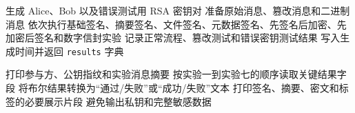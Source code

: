 \documentclass[12pt]{article}
\begin{document}
\begin{algorithm}[H]
\caption{\texttt{run\_all\_experiments()}}
\setcounter{AlgoLine}{0}
生成 Alice、Bob 以及错误测试用 RSA 密钥对\;
准备原始消息、篡改消息和二进制消息\;
依次执行基础签名、摘要签名、文件签名、元数据签名、先签名后加密、先加密后签名和数字信封实验\;
记录正常流程、篡改测试和错误密钥测试结果\;
写入生成时间并返回 \texttt{results} 字典\;
\end{algorithm}

\begin{algorithm}[H]
\caption{\texttt{print\_result\_summary(results)}}
\setcounter{AlgoLine}{0}
打印参与方、公钥指纹和实验消息摘要\;
按实验一到实验七的顺序读取关键结果字段\;
将布尔结果转换为“通过/失败”或“成功/失败”文本\;
打印签名、摘要、密文和标签的必要展示片段\;
避免输出私钥和完整敏感数据\;
\end{algorithm}
\end{document}
